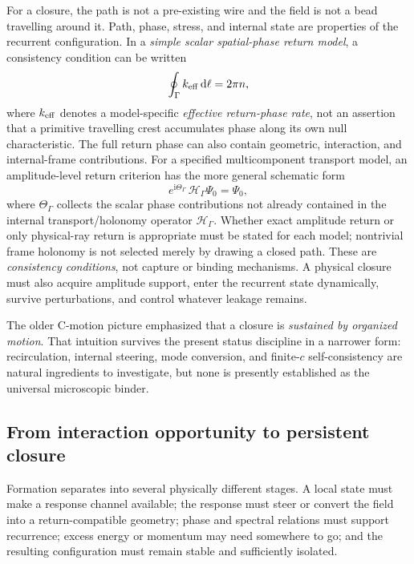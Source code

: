 \documentclass[11pt]{article}
\theoremstyle{definition}
\newcommand{\dd}{\mathrm{d}}
\begin{document}
For a closure, the path is not a pre-existing wire and the field is not a bead travelling
around it.  Path, phase, stress, and internal state are properties of the recurrent
configuration.  In a \emph{simple scalar spatial-phase return model}, a consistency
condition can be written
\begin{equation}
\oint_\Gamma k_{\rm eff}\,\dd\ell=2\pi n,
\label{eq:return_condition}
\end{equation}
where $k_{\rm eff}$ denotes a model-specific \emph{effective return-phase rate}, not an
assertion that a primitive travelling crest accumulates phase along its own null
characteristic.  The full return phase can also contain geometric, interaction, and
internal-frame contributions.  For a specified multicomponent transport model, an
amplitude-level return criterion has the more general schematic form
\begin{equation}
 e^{\mathrm i\Theta_\Gamma}\,\mathcal H_\Gamma\Psi_0=\Psi_0,
 \label{eq:general_return_holonomy}
\end{equation}
where $\Theta_\Gamma$ collects the scalar phase contributions not already contained in
the internal transport/holonomy operator $\mathcal H_\Gamma$.  Whether exact amplitude
return or only physical-ray return is appropriate must be stated for each model;
nontrivial frame holonomy is not selected merely by drawing a closed path.  These are
\emph{consistency conditions}, not capture or binding mechanisms.  A physical closure
must also acquire amplitude support, enter the recurrent state dynamically, survive
perturbations, and control whatever leakage remains.

The older C-motion picture emphasized that a closure is \emph{sustained by organized
motion}.  That intuition survives the present status discipline in a narrower form:
recirculation, internal steering, mode conversion, and finite-$c$ self-consistency are
natural ingredients to investigate, but none is presently established as the universal
microscopic binder.

\subsection{From interaction opportunity to persistent closure}
\label{subsec:return_not_binding}

Formation separates into several physically different stages.  A local state must make
a response channel available; the response must steer or convert the field into a
return-compatible geometry; phase and spectral relations must support recurrence; excess
energy or momentum may need somewhere to go; and the resulting configuration must remain
stable and sufficiently isolated.
\end{document}
